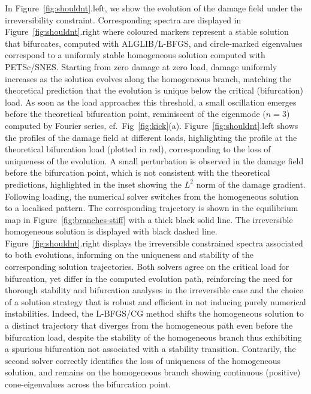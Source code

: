 \documentclass[10pt]{article}
\begin{document}
    {
        In Figure~\ref{fig:shouldnt}.left, we show the evolution of the damage field under the irreversibility constraint.
        Corresponding spectra are displayed in Figure~\ref{fig:shouldnt}.right where coloured markers represent a stable solution that bifurcates, computed with ALGLIB/L-BFGS, and circle-marked eigenvalues correspond to a uniformly stable homogeneous solution computed with PETSc/SNES.
        Starting from zero damage at zero load, damage uniformly increases as the solution evolves along the homogeneous branch, matching the theoretical prediction that the evolution is unique below the critical (bifurcation) load.
        As soon as the load approaches this threshold, a small oscillation emerges before the theoretical bifurcation point,
        reminiscent of the eigenmode ($n=3$) computed by Fourier series, {cf.~Fig~\ref{fig:kick}(a).}
        Figure~\ref{fig:shouldnt}.left shows the profiles of the damage field at different loads, highlighting the profile at the theoretical bifurcation load (plotted in red), corresponding to the loss of uniqueness of the evolution.
        A small perturbation is observed in the damage field before the bifurcation point, which is not consistent with the theoretical predictions, highlighted in the inset showing the $L^2$ norm of the damage gradient.
        Following loading, the numerical solver switches from the homogeneous solution to a localised pattern. The corresponding trajectory is shown in the equilibrium map in Figure~\ref{fig:branches-stiff} with a thick black solid line. The irreversible homogeneous solution is displayed with black dashed line.
        Figure~\ref{fig:shouldnt}.right displays the irreversible constrained spectra associated to both evolutions, informing on the uniqueness and stability of the corresponding solution trajectories.
        Both solvers agree on the critical load for bifurcation,
        yet differ in the computed evolution path, reinforcing the need for thorough stability and bifurcation analyses in the irreversible case and the choice of a solution strategy that is robust and efficient in not inducing purely numerical instabilities.
        Indeed, the L-BFGS/CG method shifts the homogeneous solution to a distinct trajectory that diverges from the homogeneous path even before the bifurcation load, despite the stability of the homogeneous branch thus  exhibiting a spurious bifurcation not associated with a stability transition.
        Contrarily, the second solver correctly identifies the loss of uniqueness of the homogeneous solution, and remains on the homogeneous branch showing continuous (positive) cone-eigenvalues across the bifurcation point.
}
\end{document}
